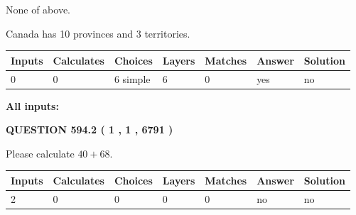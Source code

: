 \documentclass[12pt]{article}
\begin{document}
 
 None of above.
 
 
\noindent{}
 
 
Canada has 10  provinces and 3 territories.
 
 
\noindent{}
 
 
   
   
   
   
\noindent\begin{tabular}{|l|l|l|l|l|l|l|}
 \hline
Inputs & Calculates & Choices & Layers & Matches & Answer & Solution \\ \hline
 0  & 
 0  & 
 6
  simple  
  & 
 6  & 
 0  & 
  yes & 
  no 
  \\ \hline
 \end{tabular}
   
   
   
   
\noindent{}
   
   
   
   
\noindent\vspace{0.1in}\hspace{-0.08in} {\textbf{\Large{All inputs: }}}
   
   
  
\vspace{0.2in}
  
{\textbf{\Large{QUESTION
594.2 
 ( 1 , 1 , 6791 )
}}}
  
  
 
Please calculate $ %
40 +  %
68 $.
 
 
   
   
   
   
\noindent\begin{tabular}{|l|l|l|l|l|l|l|}
 \hline
Inputs & Calculates & Choices & Layers & Matches & Answer & Solution \\ \hline
 2  & 
 0  & 
 0
  & 
 0  & 
 0  & 
  no & 
  no 
  \\ \hline
 \end{tabular}
   
   
   
   
\noindent{}
   
\end{document}
